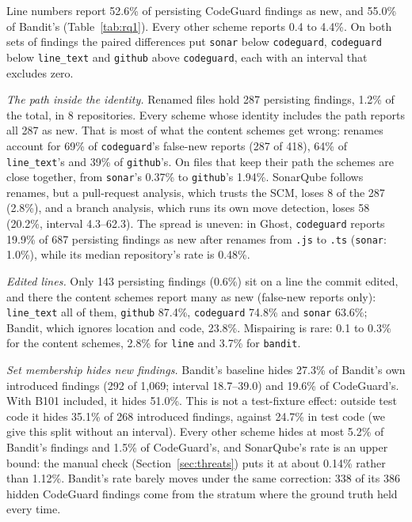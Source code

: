 \documentclass[conference]{IEEEtran}
\begin{document}


Line numbers report 52.6\% of persisting CodeGuard findings as new, and 55.0\% of
Bandit's (Table~\ref{tab:rq1}). Every other scheme reports 0.4 to 4.4\%. On both sets of
findings the paired differences put \texttt{sonar} below \texttt{codeguard},
\texttt{codeguard} below \texttt{line\_text} and \texttt{github} above
\texttt{codeguard}, each with an interval that excludes zero.

\textit{The path inside the identity.} Renamed files hold 287 persisting findings, 1.2\%
of the total, in 8 repositories. Every scheme whose identity includes the path reports
all 287 as new. That is most of what the content schemes get wrong: renames account for
69\% of \texttt{codeguard}'s false-new reports (287 of 418), 64\% of
\texttt{line\_text}'s and 39\% of \texttt{github}'s. On files that keep their path the
schemes are close together, from \texttt{sonar}'s 0.37\% to \texttt{github}'s 1.94\%.
SonarQube follows renames, but a pull-request analysis, which trusts the SCM, loses 8 of
the 287 (2.8\%), and a branch analysis, which runs its own move detection, loses 58
(20.2\%, interval 4.3--62.3). The spread is uneven: in Ghost, \texttt{codeguard} reports
19.9\% of 687 persisting findings as new after renames from \texttt{.js} to
\texttt{.ts} (\texttt{sonar}: 1.0\%), while its median repository's rate is 0.48\%.

\textit{Edited lines.} Only 143 persisting findings (0.6\%) sit on a line the commit
edited, and there the content schemes report many as new (false-new reports only):
\texttt{line\_text} all of them, \texttt{github} 87.4\%, \texttt{codeguard} 74.8\% and
\texttt{sonar} 63.6\%; Bandit, which ignores location and code, 23.8\%. Mispairing is
rare: 0.1 to 0.3\% for the content schemes, 2.8\% for \texttt{line} and 3.7\% for
\texttt{bandit}.

\textit{Set membership hides new findings.} Bandit's baseline hides 27.3\% of Bandit's
own introduced findings (292 of 1,069; interval 18.7--39.0) and 19.6\% of CodeGuard's.
With B101 included, it hides 51.0\%. This is not a test-fixture effect: outside test
code it hides 35.1\% of 268 introduced findings, against 24.7\% in test code (we give
this split without an interval). Every other scheme hides at most 5.2\% of Bandit's
findings and 1.5\% of CodeGuard's, and SonarQube's rate is an upper bound: the manual
check (Section~\ref{sec:threats}) puts it at about 0.14\% rather than 1.12\%. Bandit's
rate barely moves under the same correction: 338 of its 386 hidden CodeGuard findings
come from the stratum where the ground truth held every time.
\end{document}
